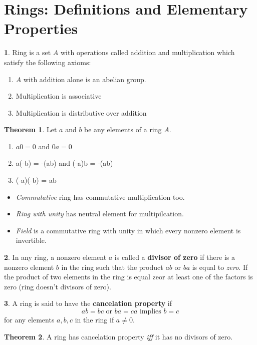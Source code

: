 \documentclass[a4paper,12pt]{article}
\theoremstyle{definition}
\newtheorem{definition}{}[section]
\theoremstyle{axiom}
\theoremstyle{theorem}
\newtheorem{theorem}{Theorem}[section]
\theoremstyle{lemma}
\begin{document}
\section{Rings: Definitions and Elementary Properties}
\begin{definition}{}
    Ring is a set $A$ with operations called addition and multiplication which satisfy the following axioms:
        \begin{enumerate}
            \item $A$ with addition alone is an abelian group.
            \item Multiplication is associative
            \item Multiplication is distributive over addition
        \end{enumerate}
\end{definition}
\begin{theorem}{}
    Let $a$ and $b$ be any elements of a ring $A$.
        \renewcommand{\labelenumiii}{\theenumi}
        \begin{enumerate}
            \item $a0 = 0$ and $0a = 0$
            \item a(-b) = -(ab) and (-a)b = -(ab)
            \item (-a)(-b) = ab
        \end{enumerate}
\end{theorem}
\begin{itemize}
    \item \textit{Commutative} ring has commutative multiplication too.
    \item \textit{Ring with unity} has neutral element for multipilcation.
    \item \textit{Field} is a commutative ring with unity in which every nonzero element is invertible.
\end{itemize}
\begin{definition}{}
        In any ring, a nonzero element $a$ is called a \textbf{divisor of zero} if there is a nonzero element $b$ in the ring such that the product $ab$ or $ba$ is equal to \textit{zero}. If the product of two elements in the ring is equal zeor at least one of the factors is zero (ring doesn't divisors of zero).
\end{definition}
\begin{definition}{}
    A ring is said to have the \textbf{cancelation property} if
        \begin{equation*}
            ab = bc \text{ or } ba = ca \text{ implies } b = c
        \end{equation*}
    for any elements $a, b, c$ in the ring if $a \neq 0$.
\end{definition}
\begin{theorem}{}
    A ring has cancelation property \textit{iff} it has no divisors of zero.
\end{theorem}
\end{document}
